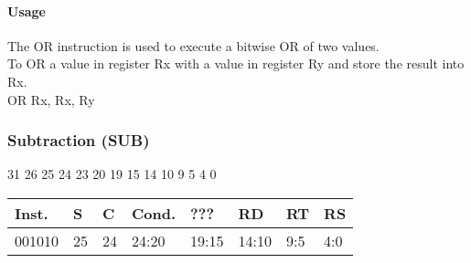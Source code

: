 \documentclass[12pt]{article}
\begin{document}
    \paragraph{Usage}
    \begin{flushleft}
    The OR instruction is used to execute a bitwise OR of two values.\\
    \vspace{1em}
    To OR a value in register Rx with a value in register Ry and store the result into Rx.\\
    \vspace{1em}
    OR Rx, Rx, Ry
    \end{flushleft}
   
   




    \newpage
    \subsubsection{Subtraction (SUB)}
    
    \hspace{1.6cm}31 \hspace{1.2cm}26 \hspace{.075cm}25 \hspace{.15cm}24 \hspace{.075cm}23 \hspace{.875cm}20 \hspace{.04cm}19 \hspace{.8cm}15 \hspace{.04cm}14 \hspace{.8cm}10 \hspace{.04cm}9 \hspace{1.15cm}5 \hspace{.04cm}4 \hspace{1.25cm}0
    \vspace{-.25cm}
    \begin{center}
        \begin{tabular}{ |p{1.8cm}|p{.3cm}|p{.3cm}|p{1.5cm}|p{1.5cm}|p{1.5cm}|p{1.5cm}|p{1.5cm}| }
            \hline
            \textbf{Inst.} & \textbf{S}& \textbf{C} & \textbf{Cond.} & ??? & \textbf{RD} & \textbf{RT} & \textbf{RS}\\
            \hline
            001010& 25 & 24 & 24:20 & 19:15 & 14:10 & 9:5 & 4:0\\
            \hline
        \end{tabular}
    \end{center}
    
\end{document}
